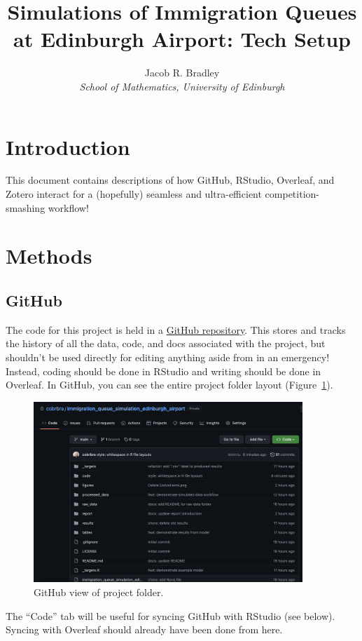 \documentclass[12pt]{article}
\title{Simulations of Immigration Queues at Edinburgh Airport: Tech Setup}
\author{Jacob R. Bradley
 \\ \emph{School of Mathematics, University of Edinburgh}}
\begin{document}
\maketitle

\section{Introduction}
This document contains descriptions of how GitHub, RStudio, Overleaf, and Zotero interact for a (hopefully) seamless and ultra-efficient competition-smashing workflow!

\section{Methods}
\subsection{GitHub}
The code for this project is held in a \href{https://github.com/cobrbra/immigration_queue_simulation_edinburgh_airport}{GitHub repository}. This stores and tracks the history of all the data, code, and docs associated with the project, but shouldn't be used directly for editing anything aside from in an emergency! Instead, coding should be done in RStudio and writing should be done in Overleaf. In GitHub, you can see the entire project folder layout (Figure~\ref{fig:github_overview}).

\begin{figure}[htbp]
    \centering
    \includegraphics[width=4in]{figures/github_overview.png}
    \caption{GitHub view of project folder.}
    \label{fig:github_overview}
\end{figure}

The ``Code'' tab will be useful for syncing GitHub with RStudio (see below). Syncing with Overleaf should already have been done from here.
\end{document}
